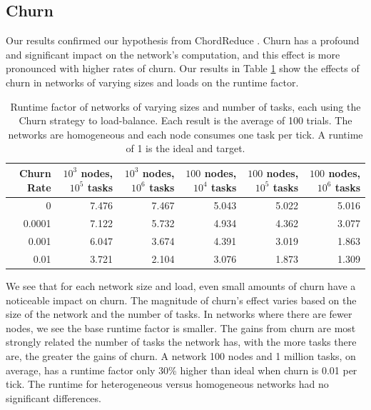 \subsection{Churn}

Our results confirmed our hypothesis from ChordReduce \cite{chordreduce}.
Churn has a profound and significant impact on the network's computation, and this effect is more pronounced with higher rates of churn.
Our results in Table \ref{tab:ChurnRuntimesHomogenious} show the effects of churn in networks of varying sizes and loads on the runtime factor.


\begin{table}[h]
	\tiny
	\centering
	\caption[Churn Runtimes in a homogenious network]{Runtime factor of networks of varying sizes and number of tasks, each using the Churn strategy to load-balance.  Each result is the average of 100 trials. The networks are homogeneous and each node consumes one task per tick.  A runtime of 1 is the ideal and target.}
	\begin{tabular}{|r || r | r | r | r | r |}
		\hline
		Churn Rate & $ 10^{3}$ nodes, $ 10^{5}$ tasks & $ 10^{3}$ nodes, $ 10^{6}$ tasks & $ 100$ nodes, $ 10^{4}$ tasks & $ 100$ nodes, $ 10^{5}$ tasks &$ 100$ nodes, $ 10^{6}$ tasks \\ \hline
		0      & 7.476   &  7.467 &  5.043& 5.022 &5.016 \\\hline
		0.0001 & 7.122   &  5.732 &  4.934& 4.362&3.077 \\\hline
		0.001  & 6.047   &  3.674 &  4.391& 3.019  &1.863\\\hline
		0.01  &  3.721   &  2.104 &  3.076& 1.873 &1.309\\\hline
		
	\end{tabular}
	\label{tab:ChurnRuntimesHomogenious}
\end{table}

We see that for each network size and load, even small amounts of churn have a noticeable impact on churn.
The magnitude of churn's effect varies based on the size of the network and the number of tasks.
In networks where there are fewer nodes, we see the base runtime factor is smaller.
The gains from churn are most strongly related the number of tasks the network has, with the more tasks there are, the greater the gains of churn.
A network 100 nodes and 1 million tasks, on average, has a runtime factor only 30\% higher than ideal when churn is 0.01 per tick.
The runtime for heterogeneous versus homogeneous networks had no significant differences.


